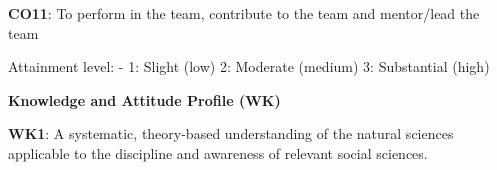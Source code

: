 \begin{titlepage}
{\textbf{CO11}: To perform in the team, contribute to the team and mentor/lead the team
}

\begin{table}[!ht]
\caption*{\textbf{CO-PO Mapping}}

\end{table}

{\small Attainment level: - 1: Slight (low) 2: Moderate (medium) 3: Substantial (high)}

\vspace{0.5cm}

\textbf{Knowledge and Attitude Profile (WK)}

\textbf{WK1}: A systematic, theory-based understanding of the natural sciences applicable to the discipline and awareness of relevant social sciences.


\end{titlepage}
